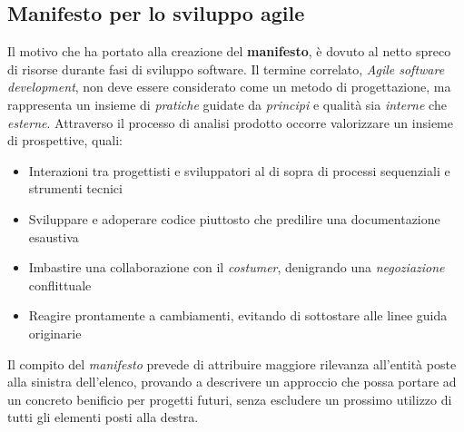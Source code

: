 \documentclass{article}
\begin{document}
\subsection*{Manifesto per lo sviluppo agile}
\large
Il motivo che ha portato alla creazione del \textbf{manifesto}, è dovuto al netto spreco di risorse durante fasi di sviluppo software. Il termine correlato, \textit{Agile software development}, non deve essere considerato come un metodo di progettazione, ma rappresenta un insieme di \textit{pratiche} guidate da \textit{principi} e qualità sia \textit{interne} che \textit{esterne}. Attraverso il processo di analisi prodotto occorre valorizzare un insieme di prospettive, quali:
\begin{itemize}[label={-}]
    \itemsep0em
    \item Interazioni tra progettisti e sviluppatori al di sopra di processi sequenziali e strumenti tecnici
    \item Sviluppare e adoperare codice piuttosto che predilire una documentazione esaustiva
    \item Imbastire una collaborazione con il \textit{costumer}, denigrando una \textit{negoziazione} conflittuale
    \item Reagire prontamente a cambiamenti, evitando di sottostare alle linee guida originarie
\end{itemize}  
Il compito del \textit{manifesto} prevede di attribuire maggiore rilevanza all'entità poste alla sinistra dell'elenco, provando a descrivere un approccio che possa portare ad un concreto benificio per progetti futuri, senza escludere un prossimo utilizzo di tutti gli elementi posti alla destra.
\end{document}
